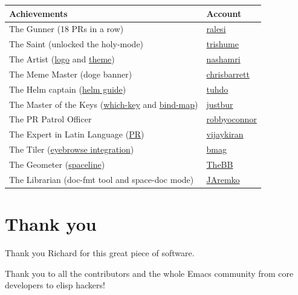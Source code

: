 \documentclass[11pt]{article}
\begin{document}
\begin{center}
\begin{tabular}{ll}
Achievements & Account\\
\hline
The Gunner (18 PRs in a row) & \href{https://github.com/ralesi}{ralesi}\\
The Saint (unlocked the holy-mode) & \href{https://github.com/trishume}{trishume}\\
The Artist (\href{https://github.com/nashamri/spacemacs-logo}{logo} and \href{https://github.com/nashamri/spacemacs-theme}{theme}) & \href{https://github.com/nashamri}{nashamri}\\
The Meme Master (doge banner) & \href{https://github.com/chrisbarrett}{chrisbarrett}\\
The Helm captain (\href{http://tuhdo.github.io/helm-intro.html}{helm guide}) & \href{https://github.com/tuhdo}{tuhdo}\\
The Master of the Keys (\href{https://github.com/justbur/emacs-which-key}{which-key} and \href{https://github.com/justbur/emacs-bind-map}{bind-map}) & \href{https://github.com/justbur}{justbur}\\
The PR Patrol Officer & \href{https://github.com/robbyoconnor}{robbyoconnor}\\
The Expert in Latin Language (\href{https://github.com/syl20bnr/spacemacs/pull/4043}{PR}) & \href{https://github.com/vijaykiran}{vijaykiran}\\
The Tiler (\href{https://github.com/syl20bnr/spacemacs/pull/4068}{eyebrowse integration}) & \href{https://github.com/bmag}{bmag}\\
The Geometer (\href{https://github.com/TheBB/spaceline}{spaceline}) & \href{https://github.com/TheBB}{TheBB}\\
The Librarian (doc-fmt tool and space-doc mode) & \href{https://github.com/JAremko}{JAremko}\\
\end{tabular}
\end{center}

\section{Thank you}
\label{sec:org841ff48}
Thank you Richard for this great piece of software.

Thank you to all the contributors and the whole Emacs community from core
developers to elisp hackers!
\end{document}
